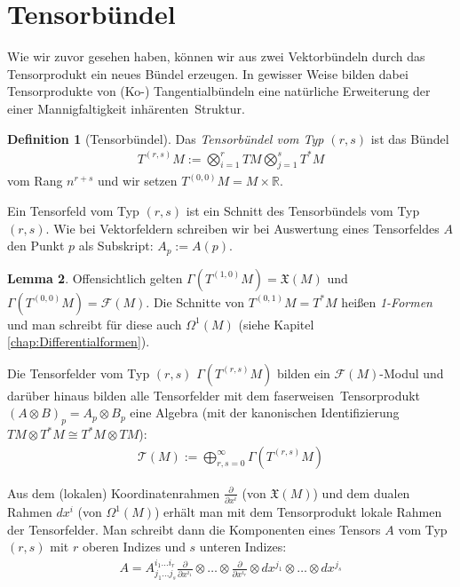 \documentclass[a4paper]{scrreprt}
\numberwithin{equation}{chapter}
\newcommand{\R}{\mathbb{R}}
\newcommand{\sm}{\mathcal{F}}
\newcommand{\vf}{\mathfrak{X}}
\theoremstyle{definition}
\newtheorem{defn}{Definition}[section]
\newtheorem{lemma}[defn]{Lemma}
\begin{document}
	\section{Tensorbündel}
		Wie wir zuvor gesehen haben, können wir aus zwei Vektorbündeln durch das Tensorprodukt ein neues Bündel erzeugen. In gewisser Weise bilden dabei Tensorprodukte von (Ko-) Tangentialbündeln eine natürliche Erweiterung der einer Mannigfaltigkeit \glqq inhärenten\grqq\ Struktur.
		\begin{defn}[Tensorbündel]
			Das \emph{Tensorbündel vom Typ $(r,s)$} ist das Bündel
			\begin{align*}
				T^{(r,s)}M:=\bigotimes_{i=1}^rTM\bigotimes_{j=1}^s T^*M
			\end{align*}
			vom Rang $n^{r+s}$ und wir setzen $T^{(0,0)}M=M\times \R$.
			
			Ein Tensorfeld vom Typ $(r,s)$ ist ein Schnitt des Tensorbündels vom Typ $(r,s)$. Wie bei Vektorfeldern schreiben wir bei Auswertung eines Tensorfeldes $A$ den Punkt $p$ als Subskript: $A_p:=A(p)$.
		\end{defn}
		\begin{lemma}
			Offensichtlich gelten $\Gamma(T^{(1,0)}M)=\vf(M)$ und $\Gamma(T^{(0,0)}M)=\sm(M)$. Die Schnitte von $T^{(0,1)}M=T^*M$ heißen \emph{1-Formen} und man schreibt für diese auch $\Omega^1(M)$ (siehe Kapitel \ref{chap:Differentialformen}).
			
			Die Tensorfelder vom Typ $(r,s)$ $\Gamma(T^{(r,s)}M)$ bilden ein $\sm(M)$-Modul und darüber hinaus bilden alle Tensorfelder mit dem \glqq faserweisen\grqq\ Tensorprodukt $(A\otimes B)_p=A_p\otimes B_p$ eine Algebra (mit der kanonischen Identifizierung $TM\otimes T^*M\cong T^*M\otimes TM$):
			\begin{align*}
				\mathcal{T}(M):=\bigoplus_{r,s=0}^{\infty}\Gamma(T^{(r,s)}M)
			\end{align*}
			
			Aus dem (lokalen) Koordinatenrahmen $\frac{\partial}{\partial x^i}$ (von $\vf(M)$) und dem dualen Rahmen $dx^i$ (von $\Omega^1(M)$) erhält man mit dem Tensorprodukt lokale Rahmen der Tensorfelder. Man schreibt dann die Komponenten eines Tensors $A$ vom Typ $(r,s)$ mit $r$ oberen Indizes und $s$ unteren Indizes:
			\begin{align*}
				A=A^{i_1\ldots i_r}_{j_1\ldots j_s}\frac{\partial}{\partial x^{i_1}}\otimes\ldots\otimes\frac{\partial}{\partial x^{i_r}}\otimes dx^{j_1}\otimes\ldots\otimes dx^{j_s}
			\end{align*}
		\end{lemma}
		
\end{document}
